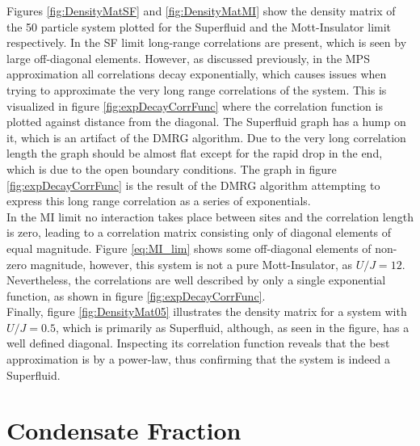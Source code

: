 Figures \ref{fig:DensityMatSF} and \ref{fig:DensityMatMI} show the density matrix of the 50 particle system plotted for the Superfluid and the Mott-Insulator limit respectively. In the SF limit long-range correlations are present, which is seen by large off-diagonal elements. However, as discussed previously, in the MPS approximation all correlations decay exponentially, which causes issues when trying to approximate the very long range correlations of the system. This is visualized in figure \ref{fig:expDecayCorrFunc} where the correlation function is plotted against distance from the diagonal. The Superfluid graph has a hump on it, which is an artifact of the DMRG algorithm. Due to the very long correlation length the graph should be almost flat except for the rapid drop in the end, which is due to the open boundary conditions. The graph in figure \ref{fig:expDecayCorrFunc} is the result of the DMRG algorithm attempting to express this long range correlation as a series of exponentials.\\
In the MI limit no interaction takes place between sites and the correlation length is zero,  leading to a correlation matrix consisting only of diagonal elements of equal magnitude. Figure \ref{eq:MI_lim} shows some off-diagonal elements of non-zero magnitude, however, this system is not a pure Mott-Insulator, as $U/J = 12$. Nevertheless, the correlations are well described by only a single exponential function, as shown in figure \ref{fig:expDecayCorrFunc}.\\
Finally, figure \ref{fig:DensityMat05} illustrates the density matrix for a system with $U/J = 0.5$, which is primarily as Superfluid, although, as seen in the figure, has a well defined diagonal. Inspecting its correlation function reveals that the best approximation is by a power-law, thus confirming that the system is indeed a Superfluid. 


\section{Condensate Fraction}

